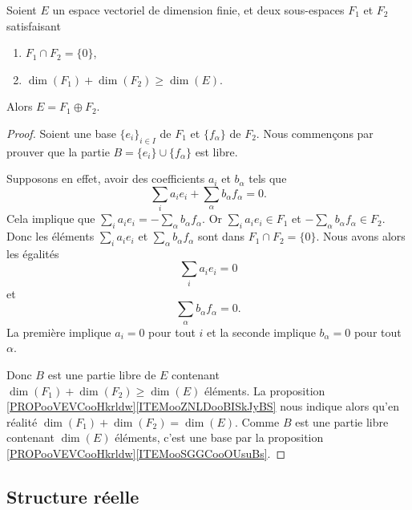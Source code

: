 \begin{proposition}               \label{PROPooCASNooEqisqa}
	Soient \( E\) un espace vectoriel de dimension finie, et deux sous-espaces \( F_1\) et \( F_2\) satisfaisant
	\begin{enumerate}
		\item
		      \( F_1\cap F_2=\{ 0 \}\),
		\item
		      \( \dim(F_1)+\dim(F_2)\geq \dim(E)\).
	\end{enumerate}
	Alors \( E=F_1\oplus F_2\).
\end{proposition}

\begin{proof}
	Soient une base \( \{ e_i \}_{i\in I}\) de \( F_1\) et \( \{ f_{\alpha} \}\) de \( F_2\). Nous commençons par prouver que la partie \( B=\{ e_i \}\cup \{ f_{\alpha} \}\) est libre.

	Supposons en effet, avoir des coefficients \( a_i\) et \( b_{\alpha}\) tels que
	\begin{equation}
		\sum_i a_ie_i+\sum_{\alpha}b_{\alpha}f_{\alpha}=0.
	\end{equation}
	Cela implique que \( \sum_ia_ie_i=-\sum_{\alpha}b_{\alpha}f_{\alpha}\). Or \( \sum_ia_ie_i\in F_1\) et \( -\sum_{\alpha}b_{\alpha}f_{\alpha}\in F_2\). Donc les éléments \( \sum_i a_ie_i\) et \( \sum_{\alpha}b_{\alpha}f_{\alpha}\) sont dans \( F_1\cap F_2=\{ 0 \}\). Nous avons alors les égalités
	\begin{equation}
		\sum_i a_ie_i=0
	\end{equation}
	et
	\begin{equation}
		\sum_{\alpha}b_{\alpha}f_{\alpha}=0.
	\end{equation}
	La première implique \( a_i=0\) pour tout \( i\) et la seconde implique \( b_{\alpha}=0\) pour tout \( \alpha\).

	Donc \( B\) est une partie libre de \( E\) contenant \( \dim(F_1)+\dim(F_2)\geq \dim(E)\) éléments. La proposition \ref{PROPooVEVCooHkrldw}\ref{ITEMooZNLDooBISkJyBS} nous indique alors qu'en réalité \( \dim(F_1)+\dim(F_2)=\dim(E)\). Comme \( B\) est une partie libre contenant \( \dim(E)\) éléments, c'est une base par la proposition \ref{PROPooVEVCooHkrldw}\ref{ITEMooSGGCooOUsuBs}.
\end{proof}

\subsection{Structure réelle}

